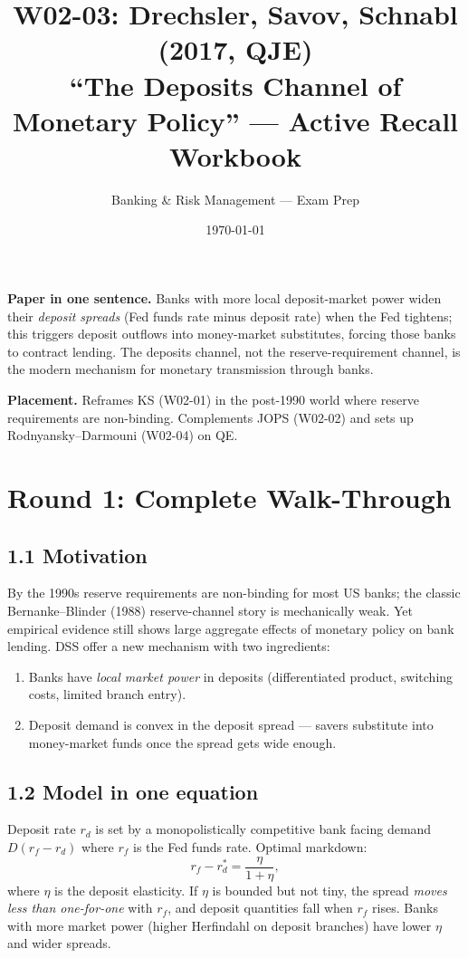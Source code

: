 \documentclass[11pt]{article}
\title{W02-03: Drechsler, Savov, Schnabl (2017, QJE) \\
\large ``The Deposits Channel of Monetary Policy'' --- Active Recall Workbook}
\author{Banking \& Risk Management --- Exam Prep}
\date{\today}
\begin{document}
\maketitle

\begin{keybox}
\textbf{Paper in one sentence.} Banks with more local deposit-market power widen their \emph{deposit spreads} (Fed funds rate minus deposit rate) when the Fed tightens; this triggers deposit outflows into money-market substitutes, forcing those banks to contract lending. The deposits channel, not the reserve-requirement channel, is the modern mechanism for monetary transmission through banks.

\textbf{Placement.} Reframes KS (W02-01) in the post-1990 world where reserve requirements are non-binding. Complements JOPS (W02-02) and sets up Rodnyansky--Darmouni (W02-04) on QE.
\end{keybox}

\section*{Round 1: Complete Walk-Through}

\subsection*{1.1 Motivation}
By the 1990s reserve requirements are non-binding for most US banks; the classic Bernanke--Blinder (1988) reserve-channel story is mechanically weak. Yet empirical evidence still shows large aggregate effects of monetary policy on bank lending. DSS offer a new mechanism with two ingredients:
\begin{enumerate}
\item Banks have \emph{local market power} in deposits (differentiated product, switching costs, limited branch entry).
\item Deposit demand is convex in the deposit spread --- savers substitute into money-market funds once the spread gets wide enough.
\end{enumerate}

\subsection*{1.2 Model in one equation}
Deposit rate $r_d$ is set by a monopolistically competitive bank facing demand $D(r_f - r_d)$ where $r_f$ is the Fed funds rate. Optimal markdown:
\[
r_f - r_d^*=\frac{\eta}{1+\eta},
\]
where $\eta$ is the deposit elasticity. If $\eta$ is bounded but not tiny, the spread \emph{moves less than one-for-one} with $r_f$, and deposit quantities fall when $r_f$ rises. Banks with more market power (higher Herfindahl on deposit branches) have lower $\eta$ and wider spreads.
\end{document}
